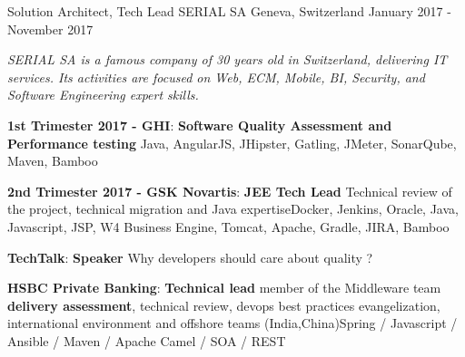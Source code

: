 \begin{cventries}
    \cventry
    {Solution Architect, Tech Lead} %
    {SERIAL SA} %
    {Geneva, Switzerland} %
    {January 2017 - November 2017} %
    {
        \begin{cvitems} %
            \item {\textit{SERIAL SA is a famous company of 30 years old in Switzerland, delivering IT services. Its activities are focused on Web, ECM, Mobile, BI, Security, and Software Engineering expert skills.}}
            \item { \textbf{1st Trimester 2017 - GHI}: \textbf{Software Quality Assessment and Performance testing} \newline Java, AngularJS, JHipster, Gatling, JMeter, SonarQube, Maven, Bamboo}
            \item { \textbf{2nd Trimester 2017 - GSK Novartis}: \textbf{JEE Tech Lead} \newline Technical review of the project, technical migration and Java expertise\newline Docker, Jenkins, Oracle, Java, Javascript, JSP, W4 Business Engine, Tomcat, Apache, Gradle, JIRA, Bamboo}
            \item { \textbf{TechTalk}: \textbf{Speaker} \newline Why developers should care about quality ?}
            \item { \textbf{HSBC Private Banking}: \textbf{Technical lead} \newline member of the Middleware team  \textbf{delivery assessment}, technical review, devops best practices evangelization, international environment and offshore teams (India,China)\newline Spring / Javascript / Ansible / Maven / Apache Camel / SOA / REST}
        \end{cvitems}
    }


\end{cventries}
